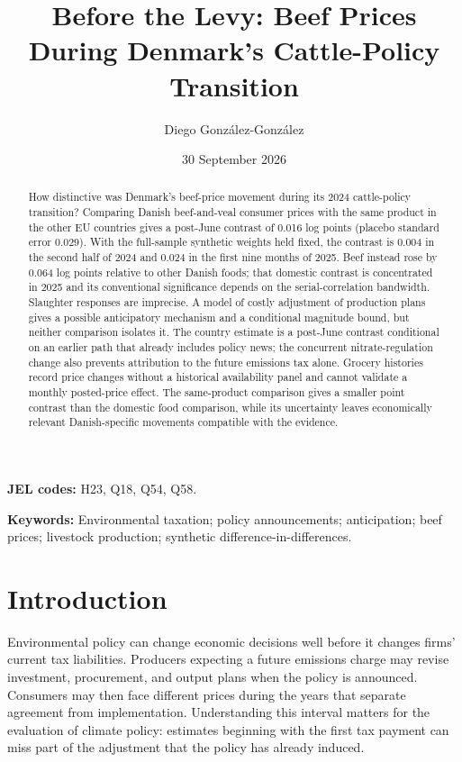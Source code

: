 \documentclass[11pt]{article}
\title{Before the Levy: Beef Prices During Denmark's Cattle-Policy Transition}
\author{Diego Gonz\'alez-Gonz\'alez}
\date{30 September 2026}
\begin{document}
\maketitle

\begin{abstract}
How distinctive was Denmark's beef-price movement during its 2024 cattle-policy transition? Comparing Danish beef-and-veal consumer prices with the same product in the other EU countries gives a post-June contrast of 0.016 log points (placebo standard error 0.029). With the full-sample synthetic weights held fixed, the contrast is 0.004 in the second half of 2024 and 0.024 in the first nine months of 2025. Beef instead rose by 0.064 log points relative to other Danish foods; that domestic contrast is concentrated in 2025 and its conventional significance depends on the serial-correlation bandwidth. Slaughter responses are imprecise. A model of costly adjustment of production plans gives a possible anticipatory mechanism and a conditional magnitude bound, but neither comparison isolates it. The country estimate is a post-June contrast conditional on an earlier path that already includes policy news; the concurrent nitrate-regulation change also prevents attribution to the future emissions tax alone. Grocery histories record price changes without a historical availability panel and cannot validate a monthly posted-price effect. The same-product comparison gives a smaller point contrast than the domestic food comparison, while its uncertainty leaves economically relevant Danish-specific movements compatible with the evidence.
\end{abstract}
\noindent\textbf{JEL codes:} H23, Q18, Q54, Q58.\par
\noindent\textbf{Keywords:} Environmental taxation; policy announcements; anticipation; beef prices; livestock production; synthetic difference-in-differences.


\section{Introduction}
Environmental policy can change economic decisions well before it changes firms' current tax liabilities. Producers expecting a future emissions charge may revise investment, procurement, and output plans when the policy is announced. Consumers may then face different prices during the years that separate agreement from implementation. Understanding this interval matters for the evaluation of climate policy: estimates beginning with the first tax payment can miss part of the adjustment that the policy has already induced.
\end{document}

